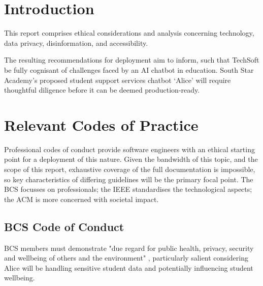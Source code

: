 \documentclass[14pt,a4paper]{article}
\begin{document}
\begin{multicols}{2}
\section{Introduction}
This report comprises ethical considerations and analysis concerning technology, data privacy, disinformation, and accessibility.

The resulting recommendations for deployment aim to inform, such that TechSoft be fully cognisant of challenges faced by an AI chatbot in education.
South Star Academy's proposed student support services chatbot `Alice' will require thoughtful diligence before it can be deemed production-ready.






\section{Relevant Codes of Practice}

Professional codes of conduct provide software engineers with an ethical starting point for a deployment of this nature.
Given the bandwidth of this topic, and the scope of this report, exhaustive coverage of the full documentation is impossible, so key characteristics of differing guidelines will be the primary focal point.
The BCS focusses on professionals; the IEEE standardises the technological aspects; the ACM is more concerned with societal impact.

\subsection{BCS Code of Conduct}

BCS members must demonstrate "due regard for public health, privacy, security and wellbeing of others and the environment" \textit{\parencite[p. 2]{BCS2024}}, particularly salient considering Alice will be handling sensitive student data and potentially influencing student wellbeing.


\end{multicols}
\end{document}
